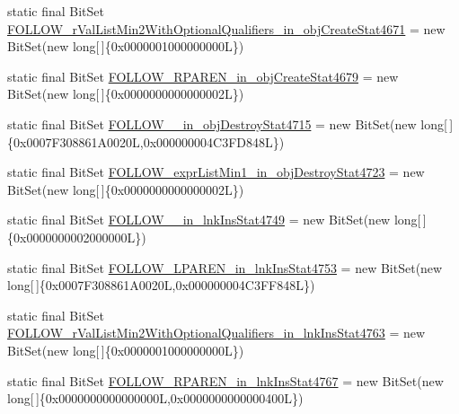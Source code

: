 \begin{DoxyCompactItemize}
\item 
static final Bit\-Set \hyperlink{classorg_1_1tzi_1_1use_1_1parser_1_1shell_1_1_shell_command_parser_acfe8178b7400adfd7a2e4c746692b121}{F\-O\-L\-L\-O\-W\-\_\-r\-Val\-List\-Min2\-With\-Optional\-Qualifiers\-\_\-in\-\_\-obj\-Create\-Stat4671} = new Bit\-Set(new long\mbox{[}$\,$\mbox{]}\{0x0000001000000000\-L\})
\item 
static final Bit\-Set \hyperlink{classorg_1_1tzi_1_1use_1_1parser_1_1shell_1_1_shell_command_parser_af5fd3f46b445f123569e873a75c5f415}{F\-O\-L\-L\-O\-W\-\_\-\-R\-P\-A\-R\-E\-N\-\_\-in\-\_\-obj\-Create\-Stat4679} = new Bit\-Set(new long\mbox{[}$\,$\mbox{]}\{0x0000000000000002\-L\})
\item 
static final Bit\-Set \hyperlink{classorg_1_1tzi_1_1use_1_1parser_1_1shell_1_1_shell_command_parser_ab179f9a50406fef6d6dc26abd1682416}{F\-O\-L\-L\-O\-W\-\_\-\_\-in\-\_\-obj\-Destroy\-Stat4715} = new Bit\-Set(new long\mbox{[}$\,$\mbox{]}\{0x0007\-F308861\-A0020\-L,0x000000004\-C3\-F\-D848\-L\})
\item 
static final Bit\-Set \hyperlink{classorg_1_1tzi_1_1use_1_1parser_1_1shell_1_1_shell_command_parser_a5c96a3b42f062a27241403179783b8ce}{F\-O\-L\-L\-O\-W\-\_\-expr\-List\-Min1\-\_\-in\-\_\-obj\-Destroy\-Stat4723} = new Bit\-Set(new long\mbox{[}$\,$\mbox{]}\{0x0000000000000002\-L\})
\item 
static final Bit\-Set \hyperlink{classorg_1_1tzi_1_1use_1_1parser_1_1shell_1_1_shell_command_parser_a1d5b04fb43436f9ec097cc706c1a1481}{F\-O\-L\-L\-O\-W\-\_\-\_\-in\-\_\-lnk\-Ins\-Stat4749} = new Bit\-Set(new long\mbox{[}$\,$\mbox{]}\{0x0000000002000000\-L\})
\item 
static final Bit\-Set \hyperlink{classorg_1_1tzi_1_1use_1_1parser_1_1shell_1_1_shell_command_parser_aae73a661f0b3b0814c72f11df47e9c05}{F\-O\-L\-L\-O\-W\-\_\-\-L\-P\-A\-R\-E\-N\-\_\-in\-\_\-lnk\-Ins\-Stat4753} = new Bit\-Set(new long\mbox{[}$\,$\mbox{]}\{0x0007\-F308861\-A0020\-L,0x000000004\-C3\-F\-F848\-L\})
\item 
static final Bit\-Set \hyperlink{classorg_1_1tzi_1_1use_1_1parser_1_1shell_1_1_shell_command_parser_a717ca8d8e8338bf7157a9f6ae75616b9}{F\-O\-L\-L\-O\-W\-\_\-r\-Val\-List\-Min2\-With\-Optional\-Qualifiers\-\_\-in\-\_\-lnk\-Ins\-Stat4763} = new Bit\-Set(new long\mbox{[}$\,$\mbox{]}\{0x0000001000000000\-L\})
\item 
static final Bit\-Set \hyperlink{classorg_1_1tzi_1_1use_1_1parser_1_1shell_1_1_shell_command_parser_a132c10e5cb6f8d78cc5c20e46df2dfe5}{F\-O\-L\-L\-O\-W\-\_\-\-R\-P\-A\-R\-E\-N\-\_\-in\-\_\-lnk\-Ins\-Stat4767} = new Bit\-Set(new long\mbox{[}$\,$\mbox{]}\{0x0000000000000000\-L,0x0000000000000400\-L\})

\end{DoxyCompactItemize}
